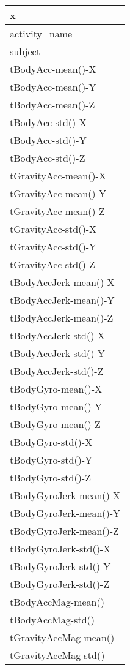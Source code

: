 \documentclass[
]{article}
\begin{document}
\begin{table}
\centering
\begin{tabular}[t]{l}
\hline
x\\
\hline
activity\_name\\
\hline
subject\\
\hline
tBodyAcc-mean()-X\\
\hline
tBodyAcc-mean()-Y\\
\hline
tBodyAcc-mean()-Z\\
\hline
tBodyAcc-std()-X\\
\hline
tBodyAcc-std()-Y\\
\hline
tBodyAcc-std()-Z\\
\hline
tGravityAcc-mean()-X\\
\hline
tGravityAcc-mean()-Y\\
\hline
tGravityAcc-mean()-Z\\
\hline
tGravityAcc-std()-X\\
\hline
tGravityAcc-std()-Y\\
\hline
tGravityAcc-std()-Z\\
\hline
tBodyAccJerk-mean()-X\\
\hline
tBodyAccJerk-mean()-Y\\
\hline
tBodyAccJerk-mean()-Z\\
\hline
tBodyAccJerk-std()-X\\
\hline
tBodyAccJerk-std()-Y\\
\hline
tBodyAccJerk-std()-Z\\
\hline
tBodyGyro-mean()-X\\
\hline
tBodyGyro-mean()-Y\\
\hline
tBodyGyro-mean()-Z\\
\hline
tBodyGyro-std()-X\\
\hline
tBodyGyro-std()-Y\\
\hline
tBodyGyro-std()-Z\\
\hline
tBodyGyroJerk-mean()-X\\
\hline
tBodyGyroJerk-mean()-Y\\
\hline
tBodyGyroJerk-mean()-Z\\
\hline
tBodyGyroJerk-std()-X\\
\hline
tBodyGyroJerk-std()-Y\\
\hline
tBodyGyroJerk-std()-Z\\
\hline
tBodyAccMag-mean()\\
\hline
tBodyAccMag-std()\\
\hline
tGravityAccMag-mean()\\
\hline
tGravityAccMag-std()\\
\hline

\end{tabular}
\end{table}
\end{document}
